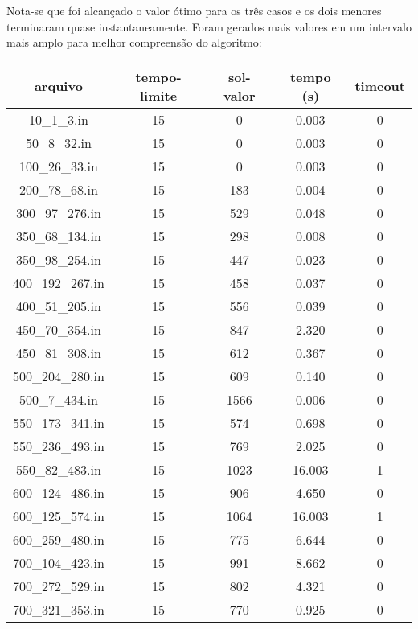 \documentclass[7pt]{article}
\begin{document}
{\begin{multicols}{2}
Nota-se que foi alcançado o valor ótimo para os três casos e os dois menores
terminaram quase instantaneamente.
Foram gerados mais valores em um intervalo mais amplo para melhor compreensão
do algoritmo:

\begin{table}[H]
\centering
\setlength{\tabcolsep}{.16667em}
\begin{tabular}{|c|c|c|c|c|}
	\hline
    arquivo & tempo-limite & sol-valor & tempo (s) & timeout\\
    \hline
    10\_1\_3.in & 15 & 0 & 0.003 & 0\\
    \hline
    50\_8\_32.in & 15 & 0 & 0.003 & 0\\
    \hline
    100\_26\_33.in & 15 & 0 & 0.003 & 0\\
    \hline
    200\_78\_68.in & 15 & 183 & 0.004 & 0\\
    \hline
    300\_97\_276.in & 15 & 529 & 0.048 & 0\\
    \hline
    350\_68\_134.in & 15 & 298 & 0.008 & 0\\
    \hline
    350\_98\_254.in & 15 & 447 & 0.023 & 0\\
    \hline
    400\_192\_267.in & 15 & 458 & 0.037 & 0\\
    \hline
    400\_51\_205.in & 15 & 556 & 0.039 & 0\\
    \hline
    450\_70\_354.in & 15 & 847 & 2.320 & 0\\
    \hline
    450\_81\_308.in & 15 & 612 & 0.367 & 0\\
    \hline
    500\_204\_280.in & 15 & 609 & 0.140 & 0\\
    \hline
    500\_7\_434.in & 15 & 1566 & 0.006 & 0\\
    \hline
    550\_173\_341.in & 15 & 574 & 0.698 & 0\\
    \hline
    550\_236\_493.in & 15 & 769 & 2.025 & 0\\
    \hline
    550\_82\_483.in & 15 & 1023 & 16.003 & 1\\
    \hline
    600\_124\_486.in & 15 & 906 & 4.650 & 0\\
    \hline
    600\_125\_574.in & 15 & 1064 & 16.003 & 1\\
    \hline
    600\_259\_480.in & 15 & 775 & 6.644 & 0\\
    \hline
    700\_104\_423.in & 15 & 991 & 8.662 & 0\\
    \hline
    700\_272\_529.in & 15 & 802 & 4.321 & 0\\
    \hline
    700\_321\_353.in & 15 & 770 & 0.925 & 0\\

\end{tabular}
\end{table}
\end{multicols}}
\end{document}
